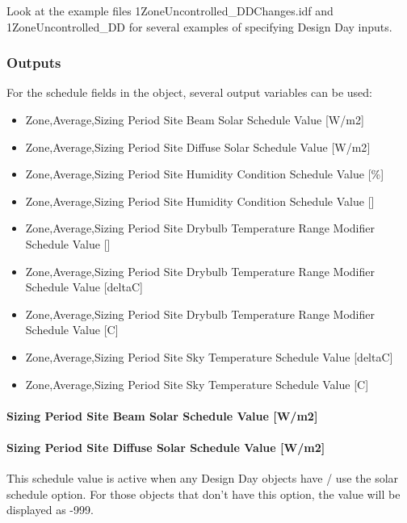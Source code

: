 Look at the example files 1Zone\-Un\-controll\-ed\_\-DD\-Changes.idf and 1Zone\-Un\-controlled\_\-DD for several examples of specifying Design Day inputs.

\subsubsection{Outputs}\label{outputs-018}

For the schedule fields in the object, several output variables can be used:

\begin{itemize}
\item
  Zone,Average,Sizing Period Site Beam Solar Schedule Value {[}W/m2{]}
\item
  Zone,Average,Sizing Period Site Diffuse Solar Schedule Value {[}W/m2{]}
\item
  Zone,Average,Sizing Period Site Humidity Condition Schedule Value {[}\%{]}
\item
  Zone,Average,Sizing Period Site Humidity Condition Schedule Value {[]}
\item
  Zone,Average,Sizing Period Site Drybulb Temperature Range Modifier Schedule Value {[]}
\item
  Zone,Average,Sizing Period Site Drybulb Temperature Range Modifier Schedule Value {[}deltaC{]}
\item
  Zone,Average,Sizing Period Site Drybulb Temperature Range Modifier Schedule Value {[}C{]}
\item
  Zone,Average,Sizing Period Site Sky Temperature Schedule Value {[}deltaC{]}
\item
  Zone,Average,Sizing Period Site Sky Temperature Schedule Value {[}C{]}
\end{itemize}

\paragraph{Sizing Period Site Beam Solar Schedule Value {[}W/m2{]}}\label{sizing-period-site-beam-solar-schedule-value-wm2}

\paragraph{Sizing Period Site Diffuse Solar Schedule Value {[}W/m2{]}}\label{sizing-period-site-diffuse-solar-schedule-value-wm2}

This schedule value is active when any Design Day objects have / use the solar schedule option. For those objects that don't have this option, the value will be displayed as -999.

